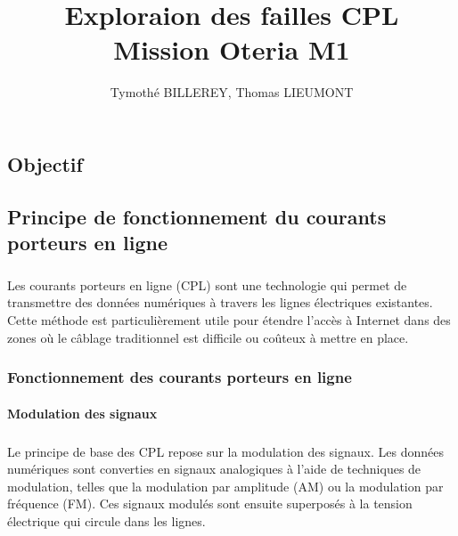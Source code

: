 \documentclass[a4paper,draft,twocolumn]{report}
\title{\Huge{Exploraion des failles CPL}\\Mission Oteria M1}
\author{Tymothé BILLEREY, Thomas LIEUMONT}
\date{}
\begin{document}
\maketitle
\newpage %
\newpage
{}
\tableofcontents
\pagebreak

\chapter{}

\section{Objectif}
\paragraph{}

\section{Principe de fonctionnement du courants porteurs en ligne}
\paragraph{} Les courants porteurs en ligne (CPL) sont une technologie qui permet de transmettre des données numériques à travers les lignes électriques existantes. Cette méthode est particulièrement utile pour étendre l'accès à Internet dans des zones où le câblage traditionnel est difficile ou coûteux à mettre en place.

\subsection{Fonctionnement des courants porteurs en ligne}

\subsubsection{Modulation des signaux}
\paragraph{} Le principe de base des CPL repose sur la modulation des signaux. Les données numériques sont converties en signaux analogiques à l'aide de techniques de modulation, telles que la modulation par amplitude (AM) ou la modulation par fréquence (FM). Ces signaux modulés sont ensuite superposés à la tension électrique qui circule dans les lignes.
\end{document}

